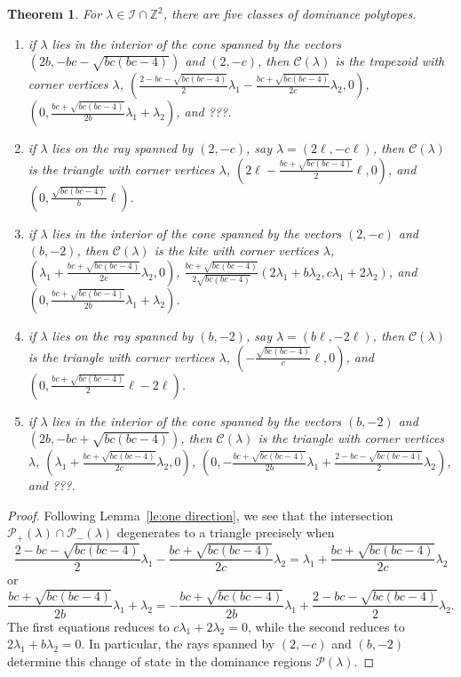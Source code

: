\documentclass{amsart}
\newtheorem{theorem}{Theorem}
\numberwithin{theorem}{section}
\newcommand{\cC}{\mathcal{C}}
\newcommand{\cI}{\mathcal{I}}
\newcommand{\cP}{\mathcal{P}}
\newcommand{\ZZ}{\mathbb{Z}}
\begin{document}
  \begin{theorem}
    For $\lambda\in\cI\cap\ZZ^2$, there are five classes of dominance polytopes.
    \begin{enumerate}
      \item if $\lambda$ lies in the interior of the cone spanned by the vectors $(2b,-bc-\sqrt{bc(bc-4)})$ and $(2,-c)$, then $\cC(\lambda)$ is the trapezoid with corner vertices $\lambda$, $(\frac{2-bc-\sqrt{bc(bc-4)}}{2}\lambda_1-\frac{bc+\sqrt{bc(bc-4)}}{2c}\lambda_2,0)$, $(0,\frac{bc+\sqrt{bc(bc-4)}}{2b}\lambda_1+\lambda_2)$, and ???.
      \item if $\lambda$ lies on the ray spanned by $(2,-c)$, say $\lambda=(2\ell,-c\ell)$, then $\cC(\lambda)$ is the triangle with corner vertices $\lambda$, $(2\ell-\frac{bc+\sqrt{bc(bc-4)}}{2}\ell,0)$, and $(0,\frac{\sqrt{bc(bc-4)}}{b}\ell)$.
      \item if $\lambda$ lies in the interior of the cone spanned by the vectors $(2,-c)$ and $(b,-2)$, then $\cC(\lambda)$ is the kite with corner vertices $\lambda$, $(\lambda_1+\frac{bc+\sqrt{bc(bc-4)}}{2c}\lambda_2,0)$, $\frac{bc+\sqrt{bc(bc-4)}}{2\sqrt{bc(bc-4)}}(2\lambda_1+b\lambda_2,c\lambda_1+2\lambda_2)$, and $(0,\frac{bc+\sqrt{bc(bc-4)}}{2b}\lambda_1+\lambda_2)$.
      \item if $\lambda$ lies on the ray spanned by $(b,-2)$, say $\lambda=(b\ell,-2\ell)$, then $\cC(\lambda)$ is the triangle with corner vertices $\lambda$, $(-\frac{\sqrt{bc(bc-4)}}{c}\ell,0)$, and $(0,\frac{bc+\sqrt{bc(bc-4)}}{2}\ell-2\ell)$.
      \item if $\lambda$ lies in the interior of the cone spanned by the vectors $(b,-2)$ and $(2b,-bc+\sqrt{bc(bc-4)})$, then $\cC(\lambda)$ is the triangle with corner vertices $\lambda$, $(\lambda_1+\frac{bc+\sqrt{bc(bc-4)}}{2c}\lambda_2,0)$, $(0,-\frac{bc+\sqrt{bc(bc-4)}}{2b}\lambda_1+\frac{2-bc-\sqrt{bc(bc-4)}}{2}\lambda_2)$, and ???.
    \end{enumerate}
  \end{theorem}
  \begin{proof}
    Following Lemma~\ref{le:one direction}, we see that the intersection $\cP_+(\lambda)\cap\cP_-(\lambda)$ degenerates to a triangle precisely when
    \[\frac{2-bc-\sqrt{bc(bc-4)}}{2}\lambda_1-\frac{bc+\sqrt{bc(bc-4)}}{2c}\lambda_2=\lambda_1+\frac{bc+\sqrt{bc(bc-4)}}{2c}\lambda_2\]
    or 
    \[\frac{bc+\sqrt{bc(bc-4)}}{2b}\lambda_1+\lambda_2=-\frac{bc+\sqrt{bc(bc-4)}}{2b}\lambda_1+\frac{2-bc-\sqrt{bc(bc-4)}}{2}\lambda_2.\]
    The first equations reduces to $c\lambda_1+2\lambda_2=0$, while the second reduces to $2\lambda_1+b\lambda_2=0$.
    In particular, the rays spanned by $(2,-c)$ and $(b,-2)$ determine this change of state in the dominance regions $\cP(\lambda)$.
  \end{proof}
\end{document}
